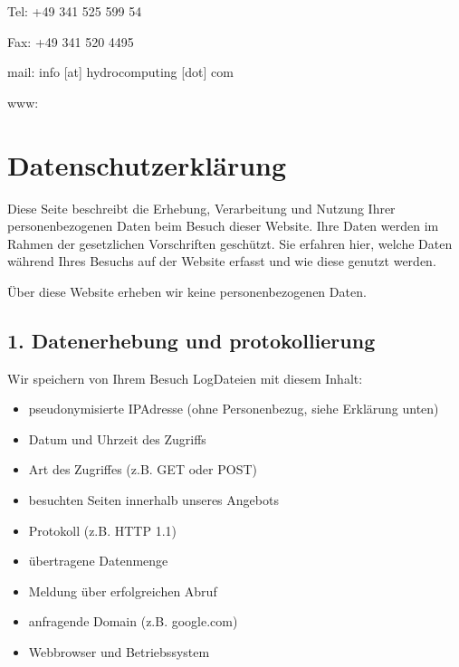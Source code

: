 \documentclass[letterpaper,10pt,english]{sphinxmanual}
\begin{document}
\begin{DUlineblock}{0em}
\item[] Tel: +49 341 525 599 54
\item[] Fax: +49 341 520 4495
\item[] mail: info {[}at{]} hydrocomputing {[}dot{]} com
\item[] www: 
\end{DUlineblock}


\chapter{Datenschutzerklärung}
\label{\detokenize{datenschutz:datenschutzerklarung}}\label{\detokenize{datenschutz::doc}}
Diese Seite beschreibt die Erhebung, Verarbeitung und Nutzung Ihrer
personenbezogenen Daten beim Besuch dieser Website.
Ihre Daten werden im Rahmen der gesetzlichen Vorschriften geschützt.
Sie erfahren hier, welche Daten während Ihres Besuchs auf der Website erfasst
und wie diese genutzt werden.

Über diese Website erheben wir keine personenbezogenen Daten.


\section{1. Datenerhebung und \sphinxhyphen{}protokollierung}
\label{\detokenize{datenschutz:datenerhebung-und-protokollierung}}
Wir speichern von Ihrem Besuch Log\sphinxhyphen{}Dateien mit diesem Inhalt:
\begin{itemize}
\item {} 
pseudonymisierte IP\sphinxhyphen{}Adresse (ohne Personenbezug, siehe Erklärung unten)

\item {} 
Datum und Uhrzeit des Zugriffs

\item {} 
Art des Zugriffes (z.B. GET oder POST)

\item {} 
besuchten Seiten innerhalb unseres Angebots

\item {} 
Protokoll (z.B. HTTP 1.1)

\item {} 
übertragene Datenmenge

\item {} 
Meldung über erfolgreichen Abruf

\item {} 
anfragende Domain (z.B. google.com)

\item {} 
Webbrowser und Betriebssystem

\end{itemize}
\end{document}
